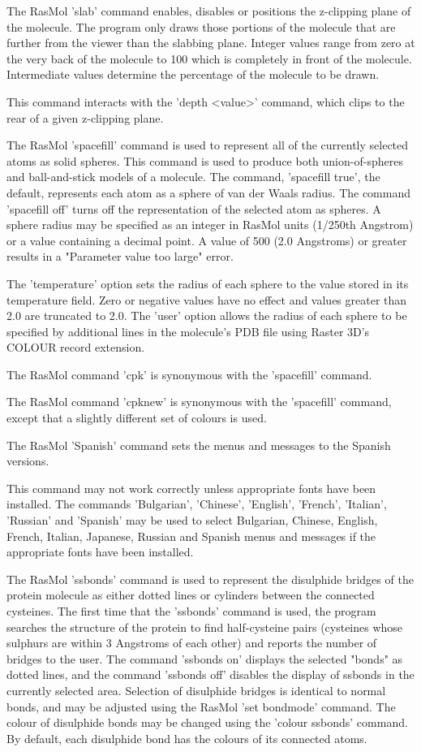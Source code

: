 The RasMol
'slab'
command enables, disables or positions the z-clipping plane of the
molecule. The program only draws those portions of the
molecule that are further from the viewer than the slabbing plane.
Integer values range from zero at the very back of the molecule to
100 which is completely in front of the molecule. Intermediate values
determine the percentage of the molecule to be drawn.

This command interacts with the
'depth <value>'
command, which clips to the rear of a given z-clipping plane.

The RasMol
'spacefill'
command is used to represent all of the currently selected atoms as solid
spheres. This command is used to produce both union-of-spheres and
ball-and-stick models of a molecule. The command,
'spacefill true',
the default, represents each atom as a sphere of van der Waals radius.
The command
'spacefill off'
turns off the representation of the selected atom as spheres. A sphere
radius may be specified as an integer in RasMol units (1/250th Angstrom)
or a value containing a decimal point. A value of 500 (2.0
Angstroms) or greater results in a "Parameter value too large" error.

The
'temperature'
option sets the radius of each sphere to the value stored in its temperature
field. Zero or negative values have no effect and values greater than
2.0 are truncated to 2.0.  The
'user'
option allows the radius of each sphere to be specified by additional lines
in the molecule's PDB file using Raster 3D's COLOUR record extension.

The RasMol command
'cpk'
is synonymous with the
'spacefill'
command.

The RasMol command
'cpknew'
is synonymous with the
'spacefill'
command, except that a slightly different set of colours is used.

The RasMol
'Spanish'
command sets the menus and messages to the Spanish versions.

This command may not work correctly unless appropriate fonts
have been installed.  The commands
'Bulgarian',
'Chinese',
'English',
'French',
'Italian',
'Russian'
and
'Spanish'
may be used to select Bulgarian, Chinese, English, French,
Italian, Japanese, Russian and Spanish menus and messages if the
appropriate fonts have been installed.

The RasMol
'ssbonds'
command is used to represent the disulphide bridges of the protein
molecule as either dotted lines or cylinders between the connected
cysteines. The first time that the
'ssbonds'
command is used, the program searches the structure of the protein to
find half-cysteine pairs (cysteines whose sulphurs are within 3 Angstroms
of each other) and reports the number of bridges to the user. The command
'ssbonds on'
displays the selected "bonds" as dotted lines, and the command
'ssbonds off'
disables the display of ssbonds in the currently selected area. Selection
of disulphide bridges is identical to normal bonds, and may be adjusted
using the RasMol
'set bondmode'
command. The colour of disulphide bonds may be changed using the
'colour ssbonds'
command. By default, each disulphide bond has the colours of its connected
atoms.

